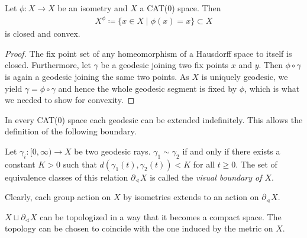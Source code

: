 \begin{prop}
  Let \(\phi \colon X \to X\) be an isometry and \(X\) a CAT(0) space. Then
  \begin{align*}
    X^\phi \coloneqq \{x \in X \mid \phi(x) = x\} \subset X
  \end{align*}
  is closed and convex.
\end{prop}

\begin{proof}
  The fix point set of any homeomorphism of a Hausdorff space to itself is closed. Furthermore, let \(\gamma\) be a geodesic joining two fix points \(x\) and \(y\). Then \(\phi \circ \gamma\) is again a geodesic joining the same two points. As \(X\) is uniquely geodesic, we yield \(\gamma = \phi \circ \gamma\) and hence the whole geodesic segment is fixed by \(\phi\), which is what we needed to show for convexity.
\end{proof}

In every CAT(0) space each geodesic can be extended indefinitely. This allows the definition of the following boundary.

\begin{defin}
  Let \(\gamma_i \colon [0, \infty) \to X\) be two geodesic rays. \(\gamma_1 \sim \gamma_2\) if and only if there exists a constant \(K > 0 \) such that \(d(\gamma_1(t), \gamma_2(t)) < K\) for all \(t \geq 0\). The set of equivalence classes of this relation \(\partial_\sphericalangle X\) is called the \emph{visual boundary of \(X\)}.

  Clearly, each group action on \(X\) by isometries extends to an action on \(\partial_\sphericalangle X\).
\end{defin}

\begin{rem}
  \(X \sqcup \partial_{\sphericalangle}X\) can be topologized in a way that it becomes a compact space. The topology can be chosen to coincide with the one induced by the metric on \(X\). 
\end{rem}

